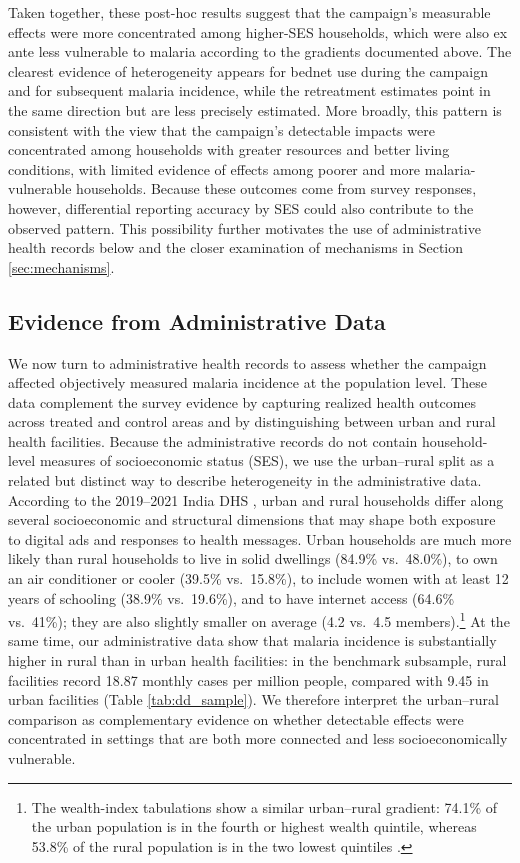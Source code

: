 Taken together, these post-hoc results suggest that the campaign’s measurable effects were more concentrated among higher-SES households, which were also ex ante less vulnerable to malaria according to the gradients documented above. The clearest evidence of heterogeneity appears for bednet use during the campaign and for subsequent malaria incidence, while the retreatment estimates point in the same direction but are less precisely estimated. More broadly, this pattern is consistent with the view that the campaign’s detectable impacts were concentrated among households with greater resources and better living conditions, with limited evidence of effects among poorer and more malaria-vulnerable households. Because these outcomes come from survey responses, however, differential reporting accuracy by SES could also contribute to the observed pattern. This possibility further motivates the use of administrative health records below and the closer examination of mechanisms in Section \ref{sec:mechanisms}.



\subsection{Evidence from Administrative Data}

We now turn to administrative health records to assess whether the campaign affected objectively measured malaria incidence at the population level. These data complement the survey evidence by capturing realized health outcomes across treated and control areas and by distinguishing between urban and rural health facilities. Because the administrative records do not contain household-level measures of socioeconomic status (SES), we use the urban--rural split as a related but distinct way to describe heterogeneity in the administrative data. According to the 2019--2021 India DHS \citep{dhs2022}, urban and rural households differ along several socioeconomic and structural dimensions that may shape both exposure to digital ads and responses to health messages. Urban households are much more likely than rural households to live in solid dwellings (84.9\% vs.\ 48.0\%), to own an air conditioner or cooler (39.5\% vs.\ 15.8\%), to include women with at least 12 years of schooling (38.9\% vs.\ 19.6\%), and to have internet access (64.6\% vs.\ 41\%); they are also slightly smaller on average (4.2 vs.\ 4.5 members).\footnote{The wealth-index tabulations show a similar urban--rural gradient: 74.1\% of the urban  population is in the fourth or highest wealth quintile, whereas 53.8\% of the rural population is in the two lowest quintiles \citep{dhs2022}.} At the same time, our administrative data show that malaria incidence is substantially higher in rural than in urban health facilities: in the benchmark subsample, rural facilities record 18.87 monthly cases per million people, compared with 9.45 in urban facilities (Table \ref{tab:dd_sample}). We therefore interpret the urban--rural comparison as complementary evidence on whether detectable effects were concentrated in settings that are both more connected and less socioeconomically vulnerable.



